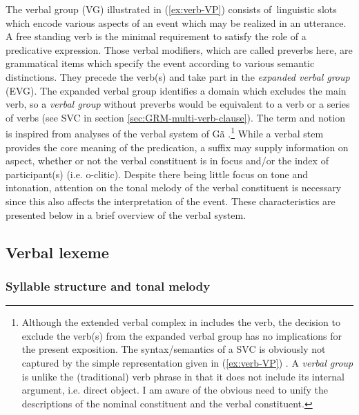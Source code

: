                  The verbal group (VG) illustrated in (\ref{ex:verb-VP})
consists of linguistic slots which encode   various aspects of an event  which
may be realized in an utterance. A free standing verb is the minimal requirement
to satisfy the role of a predicative expression. Those verbal modifiers, which
are called preverbs here,  are grammatical items which specify the event
according to various  semantic distinctions. They precede the  verb(s) and take
part in the {\it expanded verbal group} (EVG). The expanded verbal group
identifies  a domain which excludes the main verb, so a {\it verbal group}
without preverbs would  be equivalent to a verb or a series of verbs (see SVC in
section \ref{sec:GRM-multi-verb-clause}). The term and notion is inspired from
analyses of the verbal system of Gã \citep{Daku70, Daku08, Daku08b,
Hell10}.\footnote{Although the extended verbal complex in \citet[48]{Hell10}
includes the verb, the decision to exclude the verb(s) from the  expanded verbal
group has no implications for the present exposition. The syntax/semantics of a
SVC is obviously not captured by the simple representation given in
(\ref{ex:verb-VP}) \cite[see][]{Daku08b}. A {\it verbal group} is unlike the
(traditional) verb phrase in that it does not include its internal argument,
i.e. direct object. I am aware of the obvious need to unify the descriptions of
the nominal constituent and the verbal constituent.} While a verbal stem
provides the core meaning of the predication,  a suffix may supply information
on  aspect, whether or not the verbal constituent is in focus and/or the index
of participant(s) (i.e. {\sc o}-clitic).  Despite there being little focus on
tone and intonation, attention on the tonal melody of the verbal constituent is
necessary since this also affects the interpretation of the event. These
characteristics are presented below in a brief overview of the verbal system. 

% 



\subsection{Verbal lexeme}
\label{sec:GRM-verb-lexeme}


\subsubsection{Syllable structure and tonal melody}
\label{sec:GRM-verb-syll-und-tone}

